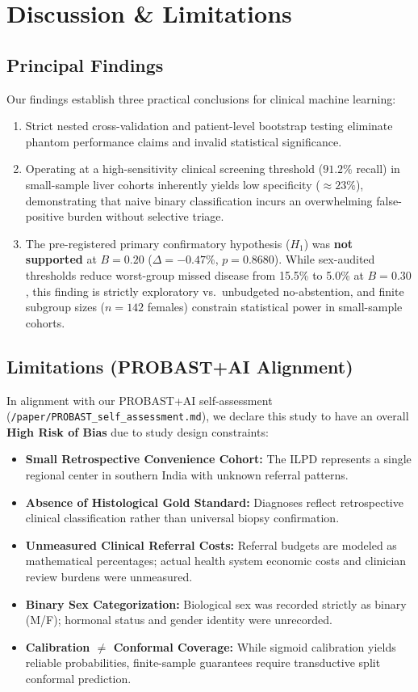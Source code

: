 \documentclass[11pt,a4paper]{article}
\begin{document}
\section{Discussion \& Limitations}

\subsection{Principal Findings}
Our findings establish three practical conclusions for clinical machine learning:
\begin{enumerate}
    \item Strict nested cross-validation and patient-level bootstrap testing eliminate phantom performance claims and invalid statistical significance.
    \item Operating at a high-sensitivity clinical screening threshold ($91.2\%$ recall) in small-sample liver cohorts inherently yields low specificity ($\approx 23\%$), demonstrating that naive binary classification incurs an overwhelming false-positive burden without selective triage.
    \item The pre-registered primary confirmatory hypothesis ($H_1$) was \textbf{not supported} at $B=0.20$ ($\Delta = -0.47\%$, $p=0.8680$). While sex-audited thresholds reduce worst-group missed disease from 15.5\% to 5.0\% at $B=0.30$, this finding is strictly exploratory vs.\ unbudgeted no-abstention, and finite subgroup sizes ($n=142$ females) constrain statistical power in small-sample cohorts.
\end{enumerate}

\subsection{Limitations (PROBAST+AI Alignment)}
In alignment with our PROBAST+AI self-assessment (\texttt{/paper/PROBAST\_self\_assessment.md}), we declare this study to have an overall \textbf{High Risk of Bias} due to study design constraints:
\begin{itemize}
    \item \textbf{Small Retrospective Convenience Cohort:} The ILPD represents a single regional center in southern India with unknown referral patterns.
    \item \textbf{Absence of Histological Gold Standard:} Diagnoses reflect retrospective clinical classification rather than universal biopsy confirmation.
    \item \textbf{Unmeasured Clinical Referral Costs:} Referral budgets are modeled as mathematical percentages; actual health system economic costs and clinician review burdens were unmeasured.
    \item \textbf{Binary Sex Categorization:} Biological sex was recorded strictly as binary (M/F); hormonal status and gender identity were unrecorded.
    \item \textbf{Calibration $\neq$ Conformal Coverage:} While sigmoid calibration yields reliable probabilities, finite-sample guarantees require transductive split conformal prediction.
\end{itemize}
\end{document}
